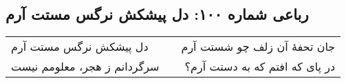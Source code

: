 \begin{center}
\section*{رباعی شماره ۱۰۰: دل پیشکش نرگس مستت آرم}
\label{sec:100}
\begin{longtable}{l p{0.5cm} r}
دل پیشکش نرگس مستت آرم
&&
جان تحفهٔ آن زلف چو شستت آرم
\\
سرگردانم ز هجر، معلومم نیست
&&
در پای که افتم که به دستت آرم؟
\\
\end{longtable}
\end{center}
